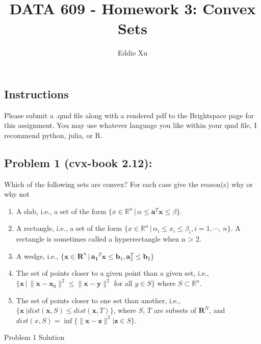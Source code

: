 \documentclass[
  letterpaper,
  DIV=11,
  numbers=noendperiod]{scrartcl}
\title{DATA 609 - Homework 3: Convex Sets}
\author{Eddie Xu}
\date{}
\providecommand{\tightlist}{%
  \setlength{\itemsep}{0pt}\setlength{\parskip}{0pt}}\usepackage{longtable,booktabs,array}
\begin{document}
\maketitle


\subsection{Instructions}\label{instructions}

Please submit a .qmd file along with a rendered pdf to the Brightspace
page for this assignment. You may use whatever language you like within
your qmd file, I recommend python, julia, or R.

\subsection{Problem 1 (cvx-book 2.12):}\label{problem-1-cvx-book-2.12}

Which of the following sets are convex? For each case give the reason(s)
why or why not

\begin{enumerate}
\def\labelenumi{\alph{enumi}.}
\tightlist
\item
  A slab, i.e., a set of the form
  \(\{x \in \mathbb{R}^n\, |\, \alpha \leq \mathbf{a}^T \mathbf{x} \leq{\beta}\}\).
\item
  A rectangle, i.e., a set of the form
  \(\{x \in \mathbb{R}^n\, |\, \alpha_i \leq x_i \leq \beta_i, i = 1,\cdots,\, n\}\).
  A rectangle is sometimes called a hyperrectangle when n \textgreater{}
  2.
\item
  A wedge, i.e.,
  \(\{ \mathbf{x} \in \mathbf{R}^n\, |\, \mathbf{a_1}^T\mathbf{x} \leq \mathbf{b}_1, \mathbf{a}_2^T\leq\mathbf{b}_2\}\)
\item
  The set of points closer to a given point than a given set, i.e.,
  \(\{ \mathbf{x}\, |\, \|\mathbf{x} − \mathbf{x}_0\|^2 \leq \|\mathbf{x} − \mathbf{y}\|^2\)
  for all \(y \in S\}\) where \(S \subset \mathbb{R}^n\).
\item
  The set of points closer to one set than another, i.e.,
  \(\{\mathbf{x}\ | dist(\mathbf{x}, S) \leq dist(\mathbf{x}, T )\}\),
  where \(S\), \(T\) are subsets of \(\mathbf{R}^N\), and
  \(dist(x, S) = \inf\{\|\mathbf{x}  − \mathbf{z}\|^2 | \mathbf{z} \in S\}\).
\end{enumerate}

Problem 1 Solution
\end{document}
